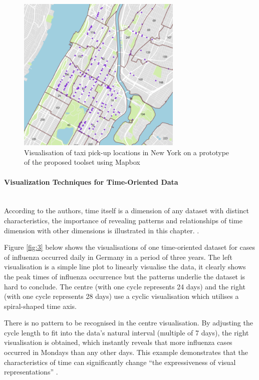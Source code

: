 \documentclass[11pt,a4paper]{article}
\begin{document}
\begin{figure}[H]
	\centering
	\includegraphics[width=0.7\textwidth,keepaspectratio]{figures/fig2.png}
	\caption{\label{fig:2}Visualisation of taxi pick-up locations in New York on a prototype of the proposed toolset using Mapbox \parencite{Mapbox2017}}
\end{figure}

\paragraph{Visualization Techniques for Time-Oriented Data}\label{par:Visualization Techniques for Time-Oriented Data}\hfill\\
According to the authors, time itself is a dimension of any dataset with distinct characteristics, the importance of revealing patterns and relationships of time dimension with other dimensions is illustrated in this chapter. \parencite[p. 254]{Ward2010}.

Figure \ref{fig:3} below shows the visualisations of one time-oriented dataset for cases of influenza occurred daily in Germany in a period of three years. The left visualisation is a simple line plot to linearly visualise the data, it clearly shows the peak times of influenza occurrence but the patterns underlie the dataset is hard to conclude. The centre (with one cycle represents 24 days) and the right (with one cycle represents 28 days) use a cyclic visualisation which utilises a spiral-shaped time axis. 

There is no pattern to be recognised in the centre visualisation. By adjusting the cycle length to fit into the data's natural interval (multiple of 7 days), the right visualisation is obtained, which instantly reveals that more influenza cases occurred in Mondays than any other days. This example demonstrates that the characteristics of time can significantly change ``the expressiveness of visual representations'' \parencite[p. 254]{Ward2010}.
\end{document}
